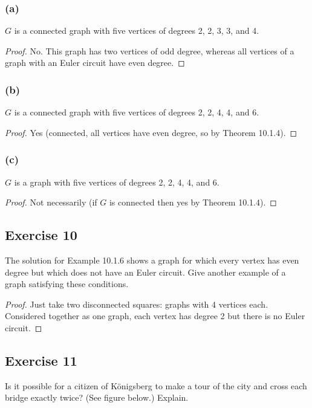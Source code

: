 \documentclass[14pt]{extarticle}
\begin{document}
\subsubsection{(a)}
\(G\) is a connected graph with five vertices of degrees 2, 2, 3, 3, and 4.
\begin{proof}
No. This graph has two vertices of odd degree, whereas all vertices of a graph with an Euler circuit have even degree.
\end{proof}

\subsubsection{(b)}
\(G\) is a connected graph with five vertices of degrees 2, 2, 4, 4, and 6.
\begin{proof}
Yes (connected, all vertices have even degree, so by Theorem 10.1.4).
\end{proof}

\subsubsection{(c)}
\(G\) is a graph with five vertices of degrees 2, 2, 4, 4, and 6.
\begin{proof}
Not necessarily (if \(G\) is connected then yes by Theorem 10.1.4).
\end{proof}

\subsection{Exercise 10}
The solution for Example 10.1.6 shows a graph for which every vertex has even degree but which does not have an Euler 
circuit. Give another example of a graph satisfying these conditions.

\begin{proof}
Just take two disconnected squares: graphs with 4 vertices each. Considered together as one graph, each vertex has degree
2 but there is no Euler circuit.
\end{proof}

\subsection{Exercise 11}
Is it possible for a citizen of Königsberg to make a tour of the city and cross each bridge exactly twice? (See figure 
below.) Explain.
\end{document}
